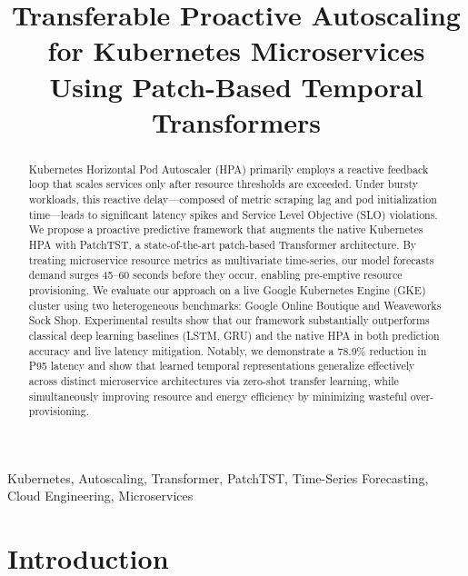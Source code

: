 \documentclass[conference]{IEEEtran}
\begin{document}
\title{Transferable Proactive Autoscaling for Kubernetes Microservices Using Patch-Based Temporal Transformers}

\author{
}

\maketitle

\begin{abstract}
Kubernetes Horizontal Pod Autoscaler (HPA) primarily employs a reactive feedback loop that scales services only after resource thresholds are exceeded. Under bursty workloads, this reactive delay—composed of metric scraping lag and pod initialization time—leads to significant latency spikes and Service Level Objective (SLO) violations. We propose a proactive predictive framework that augments the native Kubernetes HPA with PatchTST, a state-of-the-art patch-based Transformer architecture. By treating microservice resource metrics as multivariate time-series, our model forecasts demand surges 45--60 seconds before they occur, enabling pre-emptive resource provisioning. We evaluate our approach on a live Google Kubernetes Engine (GKE) cluster using two heterogeneous benchmarks: Google Online Boutique and Weaveworks Sock Shop. Experimental results show that our framework substantially outperforms classical deep learning baselines (LSTM, GRU) and the native HPA in both prediction accuracy and live latency mitigation. Notably, we demonstrate a 78.9\% reduction in P95 latency and show that learned temporal representations generalize effectively across distinct microservice architectures via zero-shot transfer learning, while simultaneously improving resource and energy efficiency by minimizing wasteful over-provisioning.
\end{abstract}

\begin{IEEEkeywords}
Kubernetes, Autoscaling, Transformer, PatchTST, Time-Series Forecasting, Cloud Engineering, Microservices
\end{IEEEkeywords}

\section{Introduction}
\end{document}
